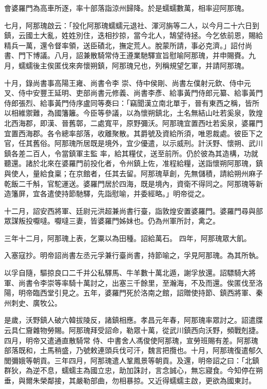 \begin{pinyinscope}
 會婆羅門為高車所逐，率十部落詣涼州歸降。於是蠕蠕數萬，相率迎阿那瑰。



 七月，阿那瑰啟云：「投化阿那瑰蠕蠕元退社、渾河旃等二人，以今月二十六日到鎮，云國土大亂，姓姓別住，迭相抄掠，當今北人，鵠望待拯。今乞依前恩，賜給精兵一萬，還令督率領，送臣磧北，撫定荒人。脫蒙所請，事必克濟。」詔付尚書、門下博議。八月，詔兼散騎常侍王遵業馳驛宣旨慰喻阿那瑰，并申賜賚。九月，蠕蠕後主俟匿伐來奔懷朔鎮，阿那瑰兄也，列稱規望乞軍，并請阿那瑰。



 十月，錄尚書事高陽王雍、尚書令李
 崇、侍中侯剛、尚書左僕射元欽、侍中元叉、侍中安豐王延明、吏部尚書元修義、尚書李彥、給事黃門侍郎元纂、給事黃門侍郎張烈、給事黃門侍序盧同等奏曰：「竊聞漢立南北單于，晉有東西之稱，皆所以相維禦難，為國籓籬。今臣等參議，以為懷朔鎮北，土名無結山吐若奚泉，敦煌北西海郡，即漢、晉舊鄣，二處寬平，原野彌沃。阿那瑰宜置西吐若奚泉，婆羅門宜置西海郡。各令總率部落，收離聚散。其爵號及資給所須，唯恩裁處。彼臣下之官，任其舊俗。阿那瑰所居既是境外，宜少優遣，以示威刑。計沃野、懷朔、武川鎮各差二百人，令當鎮軍主監
 率，給其糧仗，送至前所。仍於彼為其造構，功就聽還。諸於北來在婆羅門前投化者，令州鎮上佐，准程給糧，送詣懷朔阿那瑰，鎮與使人，量給食稟；在京館者，任其去留。阿那瑰草創，先無儲積，請給朔州麻子乾飯二千斛，官駝運送。婆羅門居於四海，既是境內，資衛不得同之。阿那瑰等新造籓屏，宜各遣使持節馳驛，先詣慰喻，并委經略。」明帝從之。



 十二月，詔安西將軍、廷尉元洪超兼尚書行臺，詣敦煌安置婆羅門。婆羅門尋與部眾謀叛投嚈噠。嚈噠三妻，皆婆羅門姊妹也。仍為州軍所討，禽之。



 三年十二月，阿那瑰上表，乞粟以為田種。詔給萬石。
 四年，阿那瑰眾大飢。



 入塞寇抄。明帝詔尚書左丞元孚兼行臺尚書，持節喻之，孚見阿那瑰。為其所執。



 以孚自隨，驅掠良口二千并公私驛馬、牛羊數十萬北遁，謝孚放還。詔驃騎大將軍、尚書令李崇等率騎十萬討之，出塞三千餘里，至瀚海，不及而還。俟匿伐至洛陽，明帝臨西堂引見之。五年，婆羅門死於洛南之館，詔贈使持節、鎮西將軍、秦州刺史、廣牧公。



 是歲，沃野鎮人破六韓拔陵反，諸鎮相應。孝昌元年春，阿那瑰率眾討之。詔遣牒云具仁齎雜物勞賜。阿那瑰拜受詔命，勒眾十萬，從武川鎮西向沃野，頻戰剋捷。四月，明帝又遣通直散騎常
 侍、中書舍人馮俊使阿那瑰，宣勞班賜有差。阿那瑰部落既和，土馬稍盛，乃號敕連頭兵伐可汗，魏言把攬也。十月，阿那瑰復遣郁久閭彌娥等朝貢。三年四月，阿那瑰遣人鞏鳳景等朝貢。及還，明帝詔之曰：「北鎮群狄，為逆不息，蠕蠕主為國立忠，助加誅討，言念誠心，無忘寢食。今知停在朔垂，與爾朱榮鄰接，其嚴勒部曲，勿相暴掠。又近得蠕蠕主啟，更欲為國東討。




\end{pinyinscope}
